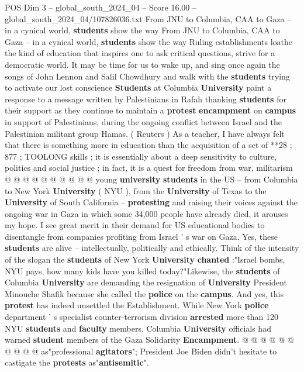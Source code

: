 \begin{textsample}{POS Dim 3 – global\_south\_2024\_04 – Score 16.00 – global\_south\_2024\_04/107826036.txt}  \label{ex:f3_pos_198}
From JNU to Columbia, CAA to Gaza -- in a cynical world, \textbf{students} show the way From JNU to Columbia, CAA to Gaza -- in a cynical world, \textbf{students} show the way Ruling establishments loathe the kind of education that inspires one to ask critical questions, strive for a democratic world.
It may be time for us to wake up, and sing once again the songs of John Lennon and Salil Chowdhury and walk with the \textbf{students} trying to activate our lost conscience \textbf{Students} at Columbia \textbf{University} paint a response to a message written by Palestinians in Rafah thanking \textbf{students} for their support as they continue to maintain a \textbf{protest} \textbf{encampment} on \textbf{campus} in support of Palestinians, during the ongoing conflict between Israel and the Palestinian militant group Hamas. ( Reuters ) As a teacher, I have always felt that there is something more in education than the acquisition of a set of **28 ; 877 ; TOOLONG skills ; it is essentially about a deep sensitivity to culture, politics and social justice ; in fact, it is a quest for freedom from war, militarism @ @ @ @ @ @ @ @ @ @ young \textbf{university} \textbf{students} in the US -- from Columbia to New York \textbf{University} ( NYU ), from the \textbf{University} of Texas to the \textbf{University} of South California -- \textbf{protesting} and raising their voices against the ongoing war in Gaza in which some 34,000 people have already died, it arouses my hope.
I see great merit in their demand for US educational bodies to disentangle from companies profiting from Israel ' s war on Gaza.
Yes, these \textbf{students} are alive -- intellectually, politically and ethically.
Think of the intensity of the slogan the \textbf{students} of New York \textbf{University} \textbf{chanted} :"Israel bombs, NYU pays, how many kids have you killed today?"Likewise, the \textbf{students} of Columbia \textbf{University} are demanding the resignation of \textbf{University} President Minouche Shafik because she called the \textbf{police} on the \textbf{campus}.
And yes, this \textbf{protest} has indeed unsettled the Establishment.
While New York \textbf{police} department ' s specialist counter-terrorism division \textbf{arrested} more than 120 NYU \textbf{students} and \textbf{faculty} members, Columbia \textbf{University} officials had warned \textbf{student} members of the Gaza Solidarity \textbf{Encampment}. @ @ @ @ @ @ @ @ @ @ as"professional \textbf{agitators}"; President Joe Biden didn't hesitate to castigate the \textbf{protests} as"\textbf{antisemitic}".

\end{textsample}

